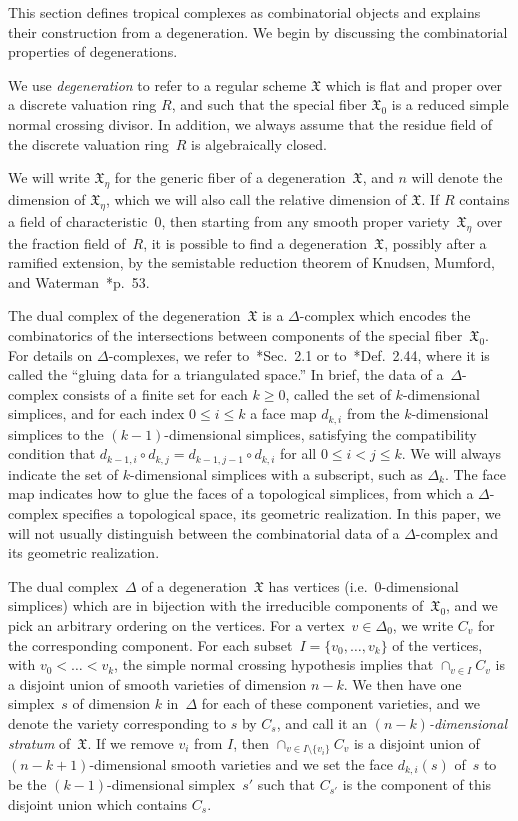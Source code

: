 \documentclass[11pt,reqno]{amsart}
\theoremstyle{definition}
\newcommand{\defi}[1]{\emph{#1}}
\newcommand{\X}{\mathfrak X}
\begin{document}
This section defines tropical complexes as combinatorial
objects and explains their construction from a degeneration. 
We begin by discussing the combinatorial
properties of degenerations.

We use \defi{degeneration} to refer to a regular scheme $\X$ which is flat and
proper over a discrete valuation ring $R$, and such that the
special fiber $\X_0$ is a reduced simple normal crossing divisor. In addition,
we always assume that the residue field of the discrete
valuation ring~$R$ is algebraically closed.

We will write $\X_\eta$ for the generic fiber of a degeneration~$\X$, and
$n$ will denote the dimension of $\X_\eta$, which we will also call the
relative dimension of $\X$. If $R$ contains a field of
characteristic~$0$, then starting from any smooth proper variety~$\X_\eta$ over
the fraction field of~$R$, it is possible to find a degeneration~$\X$, possibly
after a ramified extension, by the semistable reduction theorem of Knudsen,
Mumford, and Waterman~\cite{kkmsd}*{p.~53}.

The dual complex of the degeneration~$\X$ is a $\Delta$-complex which encodes
the combinatorics of the intersections between components of the special
fiber~$\X_0$. For details on $\Delta$-complexes, we refer
to~\cite{hatcher}*{Sec.~2.1} or to~\cite{kozlov}*{Def.~2.44}, where it is called
the ``gluing data for a triangulated space.'' In brief, the data of
a~$\Delta$-complex consists of a finite set for each $k \geq 0$, called the set
of $k$-dimensional simplices, and for each index $0 \leq i \leq k$ a face map
$d_{k,i}$ from the $k$-dimensional simplices to the $(k-1)$-dimensional
simplices, satisfying the compatibility condition that $d_{k-1,i} \circ d_{k,j}
= d_{k-1,j-1} \circ d_{k,i}$ for all $0 \leq i < j \leq k$. We will always
indicate the set of $k$-dimensional simplices with a subscript, such as
$\Delta_k$. The face map indicates how to glue the faces of a topological
simplices, from which a $\Delta$-complex specifies a topological space, its
geometric realization. In this paper, we will not usually distinguish between
the combinatorial data of a $\Delta$-complex and its geometric realization.

The dual complex~$\Delta$ of a degeneration~$\X$ has vertices (i.e.\
0-dimensional simplices) which are in bijection with the irreducible components
of~$\X_0$, and we pick an arbitrary ordering on the vertices. For a vertex~$v
\in \Delta_0$, we write $C_v$ for the corresponding component. For each
subset~$I = \{v_0, \ldots, v_k\}$ of the vertices, with $v_0 < \ldots < v_k$,
the simple normal crossing hypothesis implies that $\cap_{v \in I} C_{v}$ is a
disjoint union of smooth varieties of dimension $n - k$. We then have one
simplex~$s$ of dimension $k$ in~$\Delta$ for each of these component varieties,
and we denote the variety corresponding to $s$ by $C_s$, and call it an
\defi{$(n-k)$-dimensional stratum} of~$\X$. If we remove $v_i$ from $I$, then
$\cap_{v \in I \setminus \{v_i\}} C_v$ is a disjoint union of
$(n-k+1)$-dimensional smooth varieties and we set the face $d_{k,i}(s)$ of~$s$
to be the $(k-1)$-dimensional simplex~$s'$ such that $C_{s'}$ is the component
of this disjoint union which contains $C_s$.
\end{document}
